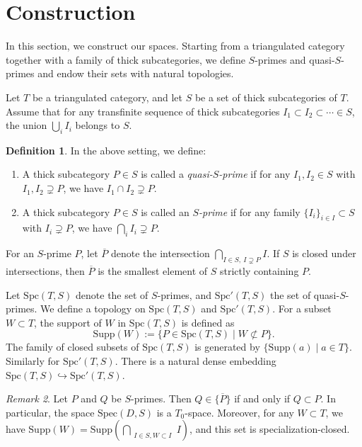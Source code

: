 \documentclass[11pt]{amsart}
\theoremstyle{definition}
\newtheorem{defn}{Definition}[section]
\theoremstyle{plain}
\theoremstyle{remark}
\newtheorem{rem}[defn]{Remark}
\newcommand{\Spec}{\mathrm{Spec}}
\newcommand{\ol}{\overline}
\newcommand{\Supp}{\mathrm{Supp}}
\newcommand{\Spc}{\mathrm{Spc}}
\numberwithin{equation}{section}
\begin{document}
\section{Construction}\label{section:construction}
In this section, we construct our spaces.
Starting from a triangulated category together with a family of thick subcategories, we define \(S\)-primes and quasi-\(S\)-primes and endow their sets with natural topologies.

Let \(T\) be a triangulated category, and let \(S\) be a set of thick subcategories of \(T\).
Assume that for any transfinite sequence of thick subcategories \( I_1 \subset I_2 \subset \cdots \in S\), the union \(\bigcup_i I_i\) belongs to \(S\).

\begin{defn}
  In the above setting, we define:
  \begin{enumerate}
    \item A thick subcategory \(P \in S\) is called a \emph{quasi-\(S\)-prime} if for any \(I_1, I_2 \in S\) with \(I_1, I_2 \supsetneq P\), we have \(I_1 \cap I_2 \supsetneq P\). 
    \item A thick subcategory \(P \in S\) is called an \emph{\(S\)-prime} if for any family \(\{I_i\}_{i \in I}\subset S\) with \(I_i \supsetneq P\), we have \(\bigcap_i I_i \supsetneq P\).
  \end{enumerate}
\end{defn}

For an \(S\)-prime \(P\), let \(\ol{P}\) denote the intersection \(\bigcap_{I\in S,\ I\supsetneq P} I\).
If \(S\) is closed under intersections, then \(\ol{P}\) is the smallest element of \(S\) strictly containing \(P\).

Let \(\Spc(T,S)\) denote the set of \(S\)-primes, and \(\Spc'(T,S)\) the set of quasi-\(S\)-primes.
We define a topology on \(\Spc(T,S)\) and \(\Spc'(T,S)\).
For a subset \(W \subset T\), the support of \(W\) in \(\Spc(T,S)\) is defined as
\[
\Supp(W):=\{P \in \Spc(T,S) \mid W \not\subset P\}.
\]
The family of closed subsets of \(\Spc(T,S)\) is generated by \(\{\Supp(a)\mid a\in T\}\).
Similarly for \(\Spc'(T,S)\).
There is a natural dense embedding \(\Spc(T,S)\hookrightarrow \Spc'(T,S)\).

\begin{rem}\label{rem:T_0_ness}
Let \(P\) and \(Q\) be \(S\)-primes.  
Then \(Q \in \overline{\{P\}}\) if and only if \(Q \subset P\).  
In particular, the space \(\Spec(D, S)\) is a \(T_0\)-space.
Moreover, for any \(W \subset T\), we have
\(
\Supp(W) = \Supp(\bigcap_{\substack{I\in S, W\subset I}} I)\), and this set is specialization-closed.
\end{rem}
\end{document}
